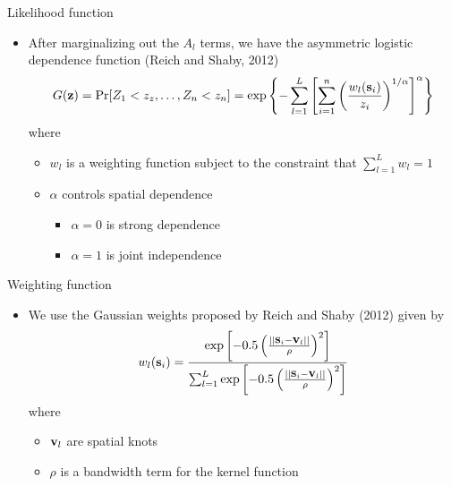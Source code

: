 \documentclass{beamer}
\begin{document}
\begin{frame}{Likelihood function}
  \begin{itemize} \setlength{\itemsep}{1em}
    \item After marginalizing out the $A_l$ terms, we have the asymmetric logistic dependence function (Reich and Shaby, 2012)
    \footnotesize{
    \begin{align*}
      G(\mbox{\bf z}) = \Pr[Z_1 < z_z, \ldots, Z_n < z_n] = \exp\left\{ - \sum_{l = 1}^{L} \left[ \sum_{i = 1}^n \left( \frac{ w_l(\mbox{\bf s}_i) }{ z_i } \right)^{ 1 / \alpha} \right]^\alpha \right\}
    \end{align*}
    }
    where
    \begin{itemize}
      \item $w_l$ is a weighting function subject to the constraint that $\sum_{l = 1}^L w_l = 1$
      \item $\alpha$ controls spatial dependence
      \begin{itemize}
        \item $\alpha = 0$ is strong dependence
        \item $\alpha = 1$ is joint independence
      \end{itemize}
    \end{itemize}
  \end{itemize}
\end{frame}

\begin{frame}{Weighting function}
  \begin{itemize} \setlength{\itemsep}{1em}
    \item We use the Gaussian weights proposed by Reich and Shaby (2012) given by
    \footnotesize{
    \begin{align*}
      w_l(\mbox{\bf s}_i) = \frac{ \exp\left[ -0.5 \left( \frac{ || \mbox{\bf s}_i - \mbox{\bf v}_l || }{ \rho} \right)^2 \right]}{ \sum_{l = 1}^L \exp\left[ -0.5 \left( \frac{ || \mbox{\bf s}_i - \mbox{\bf v}_l || }{ \rho} \right)^2 \right] }
    \end{align*}
    }
    where
    \begin{itemize}
      \item $\mbox{\bf v}_l$ are spatial knots
      \item $\rho$ is a bandwidth term for the kernel function
    \end{itemize}
  \end{itemize}
\end{frame}
\end{document}
